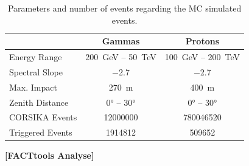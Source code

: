 \begin{table}
  \centering%
  \begin{tabular}{l
                  c
                  c}
      \toprule
      {}    & Gammas  & Protons      \\
      \midrule
      Energy Range & \SI{200}{\GeV} – \SI{50}{\TeV} & \SI{100}{\GeV} – \SI{200}{\TeV} \\
      Spectral Slope & \num{-2.7} & \num{-2.7} \\
      Max. Impact & \SI{270}{\meter} & \SI{400}{\meter} \\
      Zenith Distance & \ang{0} – \ang{30} & \ang{0} – \ang{30} \\
      CORSIKA Events & \num{12000000} & \num{780046520}\\
      Triggered Events & \num{1914812} & \num{509652}\\
      \bottomrule
  \end{tabular}
  \caption{Parameters and number of events regarding the MC simulated events.}
  \label{tab:mcs}
\end{table}

\textbf{[FACTtools Analyse]}
